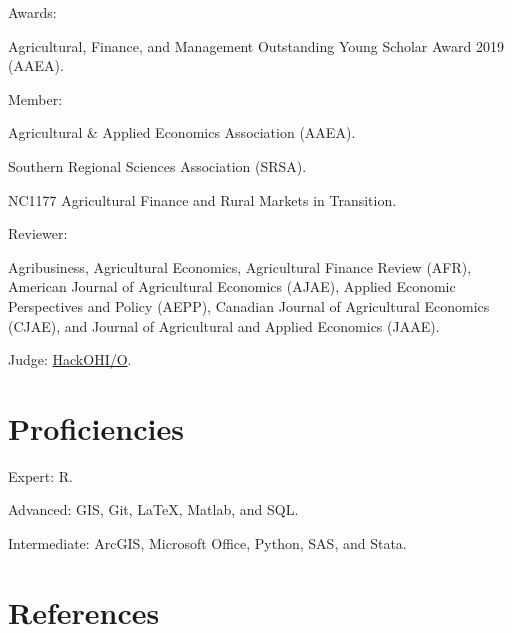 \documentclass[letterpaper]{article}
\renewenvironment{itemize}{
  \begin{list}{}{
    \setlength{\leftmargin}{1.5em}
  }
}{
  \end{list}
}
\begin{document}
\begin{itemize}
\item Awards:
\begin{itemize}
  \item Agricultural, Finance, and Management Outstanding Young Scholar Award 2019 (AAEA).
  \end{itemize}
\item Member:
  \begin{itemize}
  \item Agricultural \& Applied Economics Association (AAEA).
  \item Southern Regional Sciences Association (SRSA).
  \item NC1177 Agricultural Finance and Rural Markets in Transition.
  \end{itemize}
\item Reviewer:
  \begin{itemize}
  \item Agribusiness, Agricultural Economics, Agricultural Finance Review (AFR), American Journal of Agricultural Economics (AJAE), Applied Economic Perspectives and Policy (AEPP), Canadian Journal of Agricultural Economics (CJAE), and Journal of Agricultural and Applied Economics (JAAE).
  \end{itemize}
\item Judge: \href{http://hack.osu.edu/2016/}{HackOHI/O}.
\end{itemize}


\section*{Proficiencies}

\begin{itemize}
\item Expert: R.
\item Advanced: GIS, Git, \LaTeX, Matlab, and SQL.
\item Intermediate: ArcGIS, Microsoft Office, Python, SAS, and Stata.
\end{itemize}


\section*{References}
\end{document}
